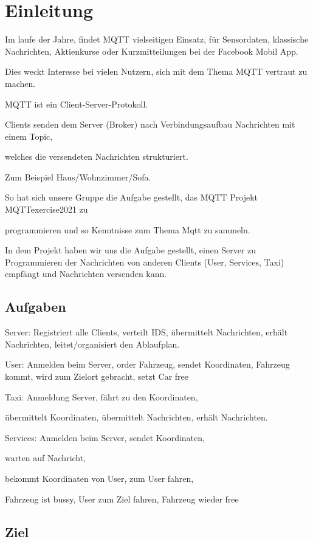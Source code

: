 \section{Einleitung}


Im laufe der Jahre, findet MQTT vielseitigen Einsatz, für Sensordaten, 
klassische Nachrichten, Aktienkurse oder Kurzmitteilungen bei der Facebook Mobil App.


Dies weckt Interesse bei vielen Nutzern, 
sich mit dem Thema MQTT vertraut zu machen.


MQTT ist ein Client-Server-Protokoll.
 

Clients senden dem Server (Broker) 
nach Verbindungsaufbau Nachrichten mit einem Topic, 

welches die versendeten Nachrichten strukturiert. 

Zum Beispiel Haus/Wohnzimmer/Sofa.


So hat sich unsere Gruppe die Aufgabe gestellt, 
das MQTT Projekt MQTTexercise2021 zu 

programmieren und so Kenntnisse zum Thema Mqtt zu sammeln.


In dem Projekt haben wir uns die Aufgabe gestellt, 
einen Server zu Programmieren der Nachrichten von anderen Clients (User, Services, Taxi) empfängt und Nachrichten versenden kann.


\subsection{Aufgaben}

Server: Registriert alle Clients, verteilt IDS, übermittelt Nachrichten, 
erhält Nachrichten, leitet/organisiert den Ablaufplan.


User: Anmelden beim Server, order Fahrzeug, sendet Koordinaten, Fahrzeug kommt, wird zum Zielort gebracht, setzt Car free


Taxi: Anmeldung Server, fährt zu den Koordinaten, 

übermittelt Koordinaten, übermittelt Nachrichten, erhält Nachrichten.


Services: Anmelden beim Server, sendet Koordinaten, 

warten auf Nachricht, 

bekommt Koordinaten von User, zum User fahren, 

Fahrzeug ist  bussy, User zum Ziel fahren, Fahrzeug wieder free

\subsection{Ziel}

